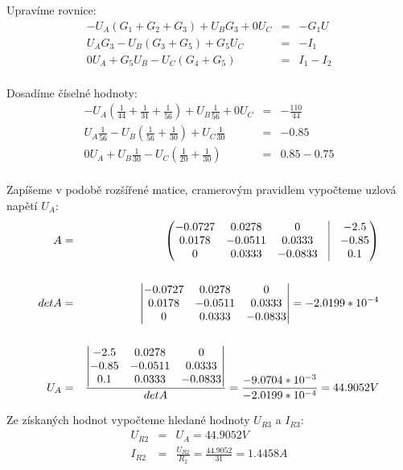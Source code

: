 \documentclass[a4paper,oneside,12pt]{article}
\begin{document}
	Upravíme rovnice:
	\begin{eqnarray*}
		- U_{A}(G_{1} + G_{2} + G_{3}) + U_{B}G_{3} + 0U_{C} & =& - G_{1}U \\
		U_{A}G_{3} - U_{B}(G_{3} + G_{5}) + G_{5}U_{C} & =& - I_{1} \\
		0U_{A} + G_{5}U_{B} - U_{C}(G_{4} + G_{5}) & =& I_{1} - I_{2} \\
	\end{eqnarray*}

	Dosadíme číselné hodnoty:
	\begin{eqnarray*}
	    - U_{A}(\frac{1}{44} + \frac{1}{31} + \frac{1}{56}) + U_{B}\frac{1}{56} + 0U_{C} & =& - \frac{110}{44} \\
	    U_{A}\frac{1}{56} - U_{B}(\frac{1}{56} + \frac{1}{30}) + U_{C}\frac{1}{30} & =& - 0.85 \\
	    0U_{A} + U_{B}\frac{1}{30} - U_{C}(\frac{1}{20} + \frac{1}{30}) & =& 0.85 - 0.75 \\
	\end{eqnarray*}

	Zapíšeme v podobě rozšířené matice, cramerovým pravidlem vypočteme uzlová napětí $U_{A}$:
	\begin{eqnarray*}
		A &= &
			\begin{pmatrix}			
				-0.0727 & 0.0278 & 0 & \vline & -2.5 \\
				0.0178 & -0.0511 & 0.0333 & \vline & -0.85 \\
				0 & 0.0333 & -0.0833 & \vline & 0.1
			\end{pmatrix} \\
		\\
		det A &= &
			\begin{vmatrix}
				-0.0727 & 0.0278 & 0  \\
				0.0178 & -0.0511 & 0.0333 \\
				0 & 0.0333 & -0.0833
			\end{vmatrix} = -2.0199 * 10^{-4} \\
		\\
		U_{A} &= & \frac{
			\begin{vmatrix}
				-2.5 & 0.0278 & 0 \\
				-0.85 & -0.0511 & 0.0333 \\
				0.1 & 0.0333 & -0.0833
			\end{vmatrix}
		}{det A} = \frac{-9.0704 * 10^{-3}}{-2.0199 * 10^{-4}} = 44.9052 V\\
	\end{eqnarray*}

	Ze získaných hodnot vypočteme hledané hodnoty $U_{R3}$ a $I_{R3}$:
	\begin{eqnarray*}
		U_{R2} &= & U_{A} = 44.9052 V\\
		I_{R2} &= & \frac{U_{R2}}{R_{2}} = \frac{44.9052}{31} = 1.4458 A\\
	\end{eqnarray*}
\end{document}
